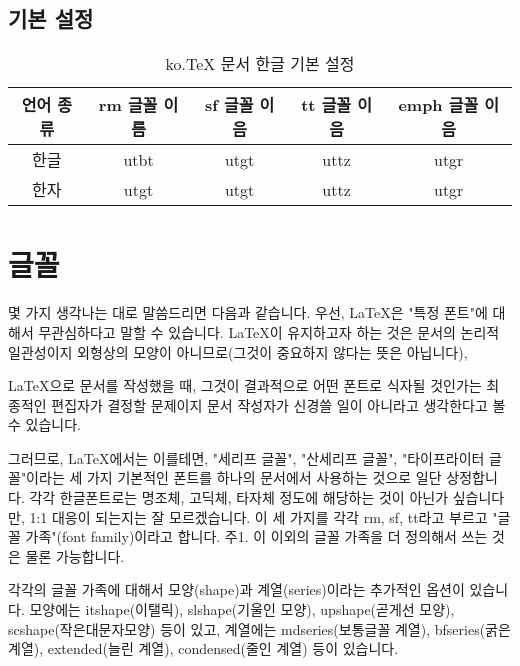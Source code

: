 	\subsection{기본 설정}
				\vspace{-1cm}
				\begin{table}[hbp]
				\caption{ko.TeX 문서 한글 기본 설정}
				\centering
				\begin{tabular}{c c c c c}
				\toprule
				언어 종류 & rm 글꼴 이름 & sf 글꼴 이음 & tt 글꼴 이음 & emph 글꼴 이음 \\
				\toprule
				한글 & utbt & utgt & uttz & utgr \\
				한자 & utgt & utgt & uttz & utgr \\
				\bottomrule
				\end{tabular}%
				\label{gibonSetting}%
				\end{table}%

	\newpage  \null
	\section{글꼴}




			몇 가지 생각나는 대로 말씀드리면 다음과 같습니다. 
			우선, LaTeX은 "특정 폰트"에 대해서 무관심하다고 말할 수 있습니다. 
			LaTeX이 유지하고자 하는 것은 문서의 논리적 일관성이지 
			외형상의 모양이 아니므로(그것이 중요하지 않다는 뜻은 아닙니다), 
			
			LaTeX으로 문서를 작성했을 때, 그것이 결과적으로 어떤 폰트로 식자될 것인가는 최
			종적인 편집자가 결정할 문제이지 문서 작성자가 신경쓸 일이 아니라고 생각한다고 
			볼 수 있습니다.
			
			그러므로, LaTeX에서는 
			이를테면, "세리프 글꼴", "산세리프 글꼴", "타이프라이터 글꼴"이라는 
			세 가지 기본적인 폰트를 하나의 문서에서 사용하는 것으로 일단 상정합니다. 
			각각 한글폰트로는 명조체, 고딕체, 타자체 정도에 해당하는 것이 아닌가 싶습니다만, 
			1:1 대응이 되는지는 잘 모르겠습니다. 
			이 세 가지를 각각 rm, sf, tt라고  부르고 "글꼴 가족"(font family)이라고 합니다.
			 주1. 이 이외의 글꼴 가족을 더 정의해서 쓰는 것은 물론 가능합니다.
			
			각각의 글꼴 가족에 대해서 
			모양(shape)과 계열(series)이라는 추가적인 옵션이 있습니다. 
			모양에는 itshape(이탤릭), slshape(기울인 모양), upshape(곧게선 모양), 
			scshape(작은대문자모양) 등이 있고, 
			계열에는 mdseries(보통글꼴 계열), bfseries(굵은 계열), extended(늘린 계열), 
			condensed(줄인 계열) 등이 있습니다.\\
			
